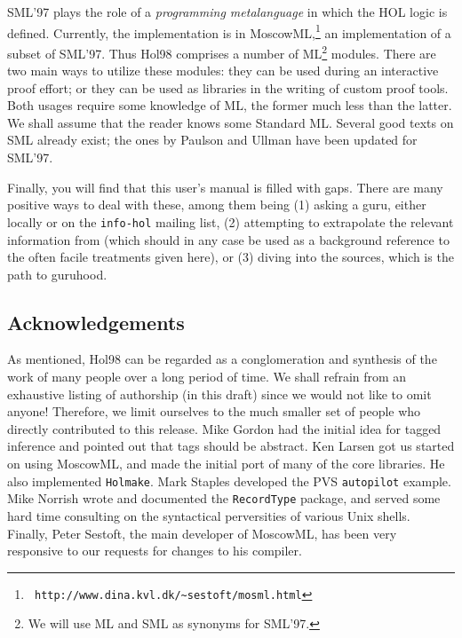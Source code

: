 \documentclass[12pt,fleqn,layout,a4paper]{report}
\begin{document}

SML'97 \cite{SML97} plays the role of a {\it programming metalanguage\/}
 in which the HOL logic is defined. Currently, the implementation is in
 MoscowML,\footnote{\tt
 http://www.dina.kvl.dk/\~{}sestoft/mosml.html}
 an implementation of a subset of SML'97.  Thus Hol98 comprises a number
 of ML\footnote{We will use ML and SML as synonyms for SML'97.}
 modules. There are two main ways to utilize these modules: they can be
 used during an interactive proof effort; or they can be used as
 libraries in the writing of custom proof tools.  Both usages require
 some knowledge of ML, the former much less than the latter. We shall
 assume that the reader knows some Standard ML. Several good texts on
 SML already exist; the ones by Paulson \cite{lcp:ml} and Ullman
 \cite{ullman:mlbook} have been updated for SML'97.

 Finally, you will find that this user's manual is filled with
 gaps. There are many positive ways to deal with these, among them being
 (1) asking a guru, either locally or on the \verb+info-hol+ mailing
 list, (2) attempting to extrapolate the relevant information from
 \cite{hol88:book} (which should in any case be used as a background
 reference to the often facile treatments given here), or (3) diving
 into the sources, which is the path to guruhood.

\subsection*{Acknowledgements}

As mentioned, Hol98 can be regarded as a conglomeration and synthesis of
the work of many people over a long period of time. We shall refrain
from an exhaustive listing of authorship (in this draft) since we would
not like to omit anyone! Therefore, we limit ourselves to the much
smaller set of people who directly contributed to this release.  Mike
Gordon had the initial idea for tagged inference and pointed out that
tags should be abstract. Ken Larsen got us started on using MoscowML,
and made the initial port of many of the core libraries. He also
implemented \verb+Holmake+. Mark Staples developed the PVS
\verb+autopilot+ example. Mike Norrish wrote and documented the
\verb+RecordType+ package, and served some hard time consulting on the
syntactical perversities of various Unix shells. Finally, Peter Sestoft,
the main developer of MoscowML, has been very responsive to our requests
for changes to his compiler.
\end{document}
